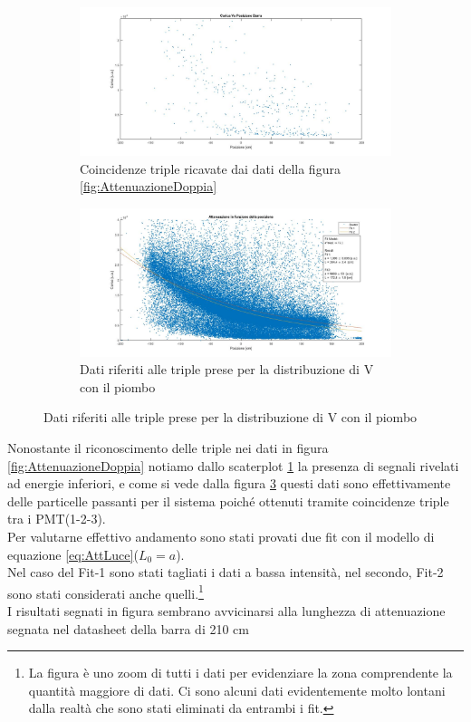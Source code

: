 \documentclass[a4paper]{article}
\begin{document}
\begin{figure}[H]
\begin{subfigure}[b]{0.45\textwidth}
\includegraphics[width=\textwidth]{./immagini/TimeOfFlight/AttenuazioneTripla.jpg}
\caption{Coincidenze triple ricavate dai dati della figura \ref{fig:AttenuazioneDoppia}}
\label{fig:AttenuazioneTripla}
\end{subfigure}
\begin{subfigure}[b]{0.45\textwidth}
\includegraphics[width=\textwidth]{./immagini/TimeOfFlight/AttenuazioneMatlab.jpg}
\caption{Dati riferiti alle triple prese per la distribuzione di V con il piombo}
\label{fig:AttenuazioneTriplaFitta}
\end{subfigure}
\end{figure}

Nonostante il riconoscimento delle triple nei dati in figura \ref{fig:AttenuazioneDoppia} notiamo dallo scaterplot \ref{fig:AttenuazioneTripla} la presenza di segnali rivelati ad energie inferiori, e come si vede dalla figura \ref{fig:AttenuazioneTriplaFitta} questi dati sono effettivamente delle particelle passanti per il sistema poiché ottenuti tramite coincidenze triple tra i PMT(1-2-3).\\
Per valutarne effettivo andamento sono stati provati due fit con il modello di equazione \ref{eq:AttLuce}($L_0 = a$).\\
Nel caso del Fit-1 sono stati tagliati i dati a bassa intensità, nel secondo, Fit-2 sono stati considerati anche quelli.\footnote{La figura è uno zoom di tutti i dati per evidenziare la zona comprendente la quantità maggiore di dati. Ci sono alcuni dati evidentemente molto lontani dalla realtà che sono stati eliminati da entrambi i fit.}\\
I risultati segnati in figura sembrano avvicinarsi alla lunghezza di attenuazione segnata nel datasheet della barra di 210 cm
\end{document}
